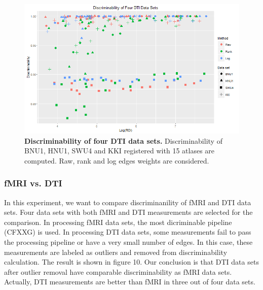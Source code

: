 \documentclass{article}
\begin{document}
\begin{figure}[ht!]
	\includegraphics[width=\linewidth]{../Figs/four_dti.png}
	\caption{{ \bf Discriminability of four DTI data sets.} Discriminability of BNU1, HNU1, SWU4 and KKI registered with 15 atlases are computed. Raw, rank and log edges weights are considered. }
	\label{fig:7}
\end{figure}

\subsubsection{fMRI vs. DTI}
In this experiment, we want to compare discriminanility of fMRI and DTI data sets. Four data sets with both fMRI and DTI measurements are selected for the comparison. In processing fMRI data sets, the most dicriminable pipeline (CFXXG) is used. In processing DTI data sets, some measurements fail to pass the processing pipeline or have a very small number of edges. In this case, these measurements are labeled as outliers and removed from discriminability calculation. The result is shown in figure 10. Our conclusion is that DTI data sets after outlier removal have comparable discriminability as fMRI data sets. Actually, DTI measurements are better than fMRI in three out of four data sets. 
\end{document}
